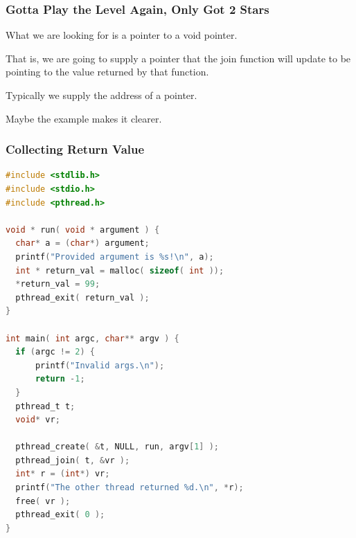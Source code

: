 \begin{frame}
	\frametitle{Gotta Play the Level Again, Only Got 2 Stars}

	What we are looking for is a pointer to a void pointer.

	That is, we are going to supply a pointer that the join function will update to be pointing to the value returned by that function.

	Typically we supply the address of a pointer.

	Maybe the example makes it clearer.
\end{frame}


\begin{frame}[fragile]
	\frametitle{Collecting Return Value}

	\begin{lstlisting}[language=C]
#include <stdlib.h>
#include <stdio.h>
#include <pthread.h>

void * run( void * argument ) { 
  char* a = (char*) argument;
  printf("Provided argument is %s!\n", a); 
  int * return_val = malloc( sizeof( int )); 
  *return_val = 99; 
  pthread_exit( return_val );
}

int main( int argc, char** argv ) { 
  if (argc != 2) {
      printf("Invalid args.\n");
      return -1; 
  }
  pthread_t t;
  void* vr; 
  
  pthread_create( &t, NULL, run, argv[1] );
  pthread_join( t, &vr );
  int* r = (int*) vr; 
  printf("The other thread returned %d.\n", *r);
  free( vr );
  pthread_exit( 0 );
}
\end{lstlisting}


\end{frame}






